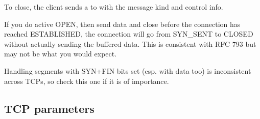 To close, the client sends a  to 
with the  message kind and 
control info.

\begin{note}
If you do active OPEN, then send data and close before the connection
has reached ESTABLISHED, the connection will go from SYN\_SENT to CLOSED
without actually sending the buffered data. This is consistent with
RFC 793 but may not be what you would expect.
\end{note}

\begin{note}
Handling segments with SYN+FIN bits set (esp. with data too) is
inconsistent across TCPs, so check this one if it is of importance.
\end{note}


\subsection{TCP parameters}

